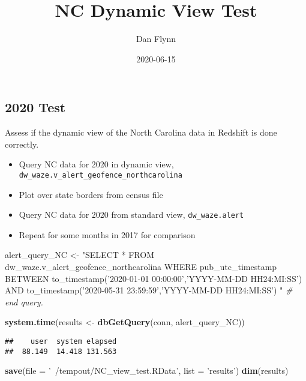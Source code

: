 \documentclass[]{article}
\title{NC Dynamic View Test}
\author{Dan Flynn}
\date{2020-06-15}
\newenvironment{Shaded}{\begin{snugshade}}{\end{snugshade}}
\newcommand{\CommentTok}[1]{\textcolor[rgb]{0.56,0.35,0.01}{\textit{#1}}}
\newcommand{\DataTypeTok}[1]{\textcolor[rgb]{0.13,0.29,0.53}{#1}}
\newcommand{\KeywordTok}[1]{\textcolor[rgb]{0.13,0.29,0.53}{\textbf{#1}}}
\newcommand{\NormalTok}[1]{#1}
\newcommand{\StringTok}[1]{\textcolor[rgb]{0.31,0.60,0.02}{#1}}
\providecommand{\tightlist}{%
  \setlength{\itemsep}{0pt}\setlength{\parskip}{0pt}}
\begin{document}
\maketitle

\hypertarget{test}{%
\subsection{2020 Test}\label{test}}

Assess if the dynamic view of the North Carolina data in Redshift is
done correctly.

\begin{itemize}
\tightlist
\item
  Query NC data for 2020 in dynamic view,
  \texttt{dw\_waze.v\_alert\_geofence\_northcarolina}
\item
  Plot over state borders from census file
\item
  Query NC data for 2020 from standard view, \texttt{dw\_waze.alert}
\item
  Repeat for some months in 2017 for comparison
\end{itemize}

\begin{Shaded}
\begin{Highlighting}[]
\NormalTok{alert_query_NC <-}\StringTok{ "SELECT * FROM dw_waze.v_alert_geofence_northcarolina }
\StringTok{                    WHERE pub_utc_timestamp BETWEEN to_timestamp('2020-01-01 00:00:00','YYYY-MM-DD HH24:MI:SS') }
\StringTok{                                          AND     to_timestamp('2020-05-31 23:59:59','YYYY-MM-DD HH24:MI:SS')}
\StringTok{                      "} \CommentTok{# end query. }

\KeywordTok{system.time}\NormalTok{(results <-}\StringTok{ }\KeywordTok{dbGetQuery}\NormalTok{(conn, alert_query_NC))}
\end{Highlighting}
\end{Shaded}

\begin{verbatim}
##    user  system elapsed 
##  88.149  14.418 131.563
\end{verbatim}

\begin{Shaded}
\begin{Highlighting}[]
\KeywordTok{save}\NormalTok{(}\DataTypeTok{file =} \StringTok{'~/tempout/NC_view_test.RData'}\NormalTok{, }\DataTypeTok{list =} \StringTok{'results'}\NormalTok{)}
\KeywordTok{dim}\NormalTok{(results)}
\end{Highlighting}
\end{Shaded}
\end{document}
